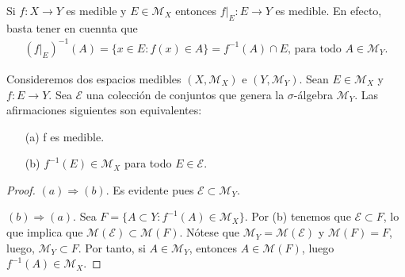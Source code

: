 \begin{obs}
    Si $f: X \longrightarrow Y$ es medible y $E \in \mathcal{M}_X$ entonces $f|_E: E \longrightarrow Y$ es medible. En efecto, basta tener en cuennta que
    \begin{align*}
        (f|_E)^{-1}(A) = \{ x \in E : f(x) \in A \} = f^{-1}(A) \cap E \text{, para todo } A \in \mathcal{M}_Y.
    \end{align*}
\end{obs}
\begin{teo}
    Consideremos dos espacios medibles $(X, \mathcal{M}_X)$ e $(Y, \mathcal{M}_Y)$. Sean $E \in \mathcal{M}_X$ y $f : E \longrightarrow Y$. Sea $\mathcal{E}$ una colección de conjuntos que genera la $\sigma$-álgebra $\mathcal{M}_Y$. Las afirmaciones siguientes son equivalentes:
    \begin{enumerate}
        \item[(a)] f es medible.
        \item[(b)] $f^{-1}(E) \in \mathcal{M}_X$ para todo $E \in \mathcal{E}$.
    \end{enumerate}
\end{teo}
\begin{proof}
    $(a) \Longrightarrow (b)$. Es evidente pues $\mathcal{E} \subset \mathcal{M}_Y$.

    $(b) \Longrightarrow (a)$. Sea $F = \{ A \subset  Y : f^{-1}(A) \in \mathcal{M}_X\}$. Por (b) tenemos que $\mathcal{E} \subset F$, lo que implica que $\mathcal{M}(\mathcal{E}) \subset \mathcal{M}(F)$. Nótese que $\mathcal{M}_Y = \mathcal{M}(\mathcal{E})$ y $\mathcal{M}(F) = F$, luego, $\mathcal{M}_Y \subset F$. Por tanto, si $A \in \mathcal{M}_Y$, entonces $A \in \mathcal{M}(F)$, luego $f^{-1}(A) \in \mathcal{M}_X$.
\end{proof}

